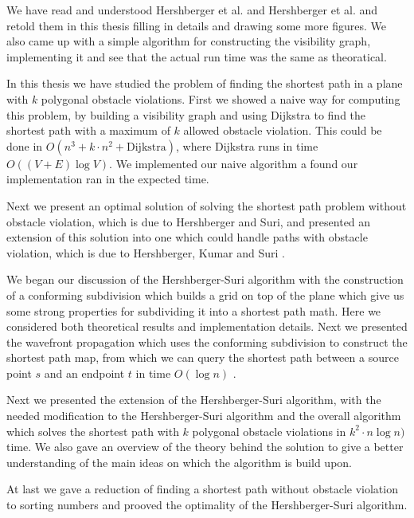 We have read and understood Hershberger et al. \cite{HershbergerS99} and
Hershberger et al. \cite{HershbergerKS17} and retold them in this thesis
filling in details and drawing some more figures. We also came up with a simple
algorithm for constructing the visibility graph, implementing it and see that
the actual run time was the same as theoratical.

In this thesis we have studied the problem of finding the shortest path in a plane with $k$ 
polygonal obstacle violations. First we showed a naive way for computing this problem, by 
building a visibility graph and using Dijkstra to find the shortest path with a maximum of 
$k$ allowed obstacle violation. This could be done in $O(n^3 + k \cdot n^2 + \text{Dijkstra})$, 
where Dijkstra runs in time $O((V + E) \log V)$. We implemented our naive algorithm a found 
our implementation ran in the expected time. 

Next we present an optimal solution of solving the shortest path problem without obstacle violation, 
which is due to Hershberger and Suri\cite{HershbergerS99}, and presented an extension of this solution 
into one which could handle paths with obstacle violation, which is due to Hershberger, Kumar and Suri
\cite{HershbergerKS17}. 

We began our discussion of the Hershberger-Suri algorithm with the construction of a conforming 
subdivision which builds a grid on top of the plane which give us some strong properties for subdividing 
it into a shortest path math. Here we considered both theoretical results and implementation details. 
Next we presented the wavefront propagation which uses the conforming subdivision to construct 
the shortest path map, from which we can query the shortest path between a source point $s$ 
and an endpoint $t$ in time $O(\log n)$ \cite{DBLP:journals/siamcomp/Kirkpatrick83}. 

Next we presented the extension of the Hershberger-Suri algorithm, with the needed modification
to the Hershberger-Suri algorithm and the overall algorithm which solves the shortest path with
$k$ polygonal obstacle violations in $k^2 \cdot n \log n)$ time. We also gave an overview of the
theory behind the solution to give a better understanding of the main ideas on which the algorithm
is build upon.

At last we gave a reduction of finding a shortest path without obstacle violation to sorting numbers
and prooved the optimality of the Hershberger-Suri algorithm.

